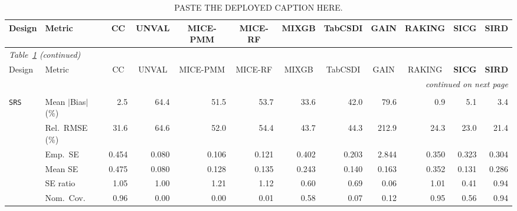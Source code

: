 \begin{landscape}
\footnotesize\setlength{\tabcolsep}{3.5pt}
\begin{longtable}{llrrrrrrrrrr}
\caption{PASTE THE DEPLOYED CAPTION HERE.}
\label{tab:appc_nutri_Binomial} \\
\toprule
Design & Metric & \multicolumn{1}{c}{CC} & \multicolumn{1}{c}{UNVAL} & \multicolumn{1}{c}{MICE-PMM} & \multicolumn{1}{c}{MICE-RF} & \multicolumn{1}{c}{MIXGB} & \multicolumn{1}{c}{TabCSDI} & \multicolumn{1}{c}{GAIN} & \multicolumn{1}{c}{RAKING} & \multicolumn{1}{c}{\textbf{SICG}} & \multicolumn{1}{c}{\textbf{SIRD}} \\
\midrule \endfirsthead
\multicolumn{12}{l}{\footnotesize\itshape Table~\ref{tab:appc_nutri_Binomial} (continued)} \\
\toprule
Design & Metric & \multicolumn{1}{c}{CC} & \multicolumn{1}{c}{UNVAL} & \multicolumn{1}{c}{MICE-PMM} & \multicolumn{1}{c}{MICE-RF} & \multicolumn{1}{c}{MIXGB} & \multicolumn{1}{c}{TabCSDI} & \multicolumn{1}{c}{GAIN} & \multicolumn{1}{c}{RAKING} & \multicolumn{1}{c}{\textbf{SICG}} & \multicolumn{1}{c}{\textbf{SIRD}} \\
\midrule \endhead
\midrule \multicolumn{12}{r}{\footnotesize\itshape continued on next page} \\
\endfoot
\bottomrule \endlastfoot
\multicolumn{12}{l}{\textbf{Continuous Phase-Two Covariates}} \\
\addlinespace[2pt]
\quad \texttt{SRS} & Mean $|$Bias$|$ (\%) & \cellcolor{ranktwo}2.5 & 64.4 & 51.5 & 53.7 & 33.6 & 42.0 & 79.6 & \cellcolor{rankone}0.9 & 5.1 & \cellcolor{rankthree}3.4 \\
 & Rel.\ RMSE (\%) & 31.6 & 64.6 & 52.0 & 54.4 & 43.7 & 44.3 & 212.9 & \cellcolor{rankthree}24.3 & \cellcolor{ranktwo}23.0 & \cellcolor{rankone}21.4 \\
 & Emp.\ SE & 0.454 & 0.080 & 0.106 & 0.121 & 0.402 & 0.203 & 2.844 & 0.350 & 0.323 & 0.304 \\
 & Mean SE & 0.475 & 0.080 & 0.128 & 0.135 & 0.243 & 0.140 & 0.163 & 0.352 & 0.131 & 0.286 \\
 & SE ratio & \cellcolor{rankthree}1.05 & \cellcolor{rankone}1.00 & 1.21 & 1.12 & 0.60 & 0.69 & 0.06 & \cellcolor{ranktwo}1.01 & 0.41 & 0.94 \\
 & Nom.\ Cov. & \cellcolor{ranktwo}0.96 & 0.00 & 0.00 & 0.01 & 0.58 & 0.07 & 0.12 & \cellcolor{rankone}0.95 & 0.56 & \cellcolor{rankthree}0.94 \\

\end{longtable}
\end{landscape}
